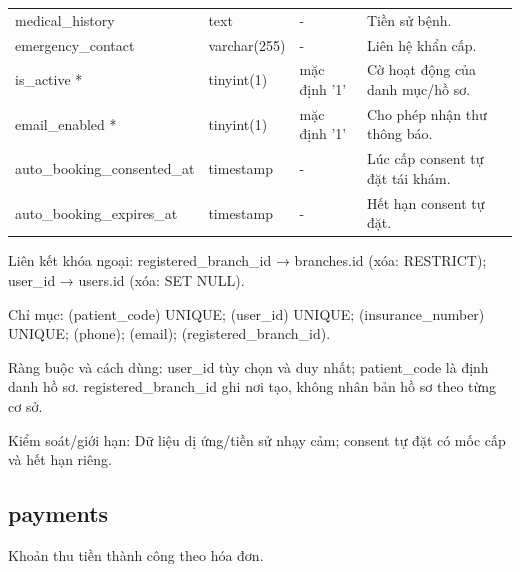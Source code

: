 {\begin{longtable}{@{}L{\textwidth-4.86pt\relax} L{\textwidth-3.96pt\relax} L{\textwidth-2.88pt\relax} L{\textwidth-6.3pt\relax}@{}}
medical\_\allowbreak{}history & text & - & Tiền sử bệnh.\allowbreak{}\\[1pt]
emergency\_\allowbreak{}contact & varchar(255) & - & Liên hệ khẩn cấp.\allowbreak{}\\[1pt]
is\_\allowbreak{}active * & tinyint(1) & mặc định '1' & Cờ hoạt động của danh mục/\allowbreak{}hồ sơ.\allowbreak{}\\[1pt]
email\_\allowbreak{}enabled * & tinyint(1) & mặc định '1' & Cho phép nhận thư thông báo.\allowbreak{}\\[1pt]
auto\_\allowbreak{}booking\_\allowbreak{}consented\_\allowbreak{}at & timestamp & - & Lúc cấp consent tự đặt tái khám.\allowbreak{}\\[1pt]
auto\_\allowbreak{}booking\_\allowbreak{}expires\_\allowbreak{}at & timestamp & - & Hết hạn consent tự đặt.\allowbreak{}\\[1pt]
\end{longtable}}
Liên kết khóa ngoại:\allowbreak{} registered\_\allowbreak{}branch\_\allowbreak{}id → branches.\allowbreak{}id (xóa:\allowbreak{} RESTRICT); user\_\allowbreak{}id → users.\allowbreak{}id (xóa:\allowbreak{} SET NULL).\allowbreak{}

Chỉ mục:\allowbreak{} (patient\_\allowbreak{}code) UNIQUE; (user\_\allowbreak{}id) UNIQUE; (insurance\_\allowbreak{}number) UNIQUE; (phone); (email); (registered\_\allowbreak{}branch\_\allowbreak{}id).\allowbreak{}

Ràng buộc và cách dùng:\allowbreak{} user\_\allowbreak{}id tùy chọn và duy nhất; patient\_\allowbreak{}code là định danh hồ sơ.\allowbreak{} registered\_\allowbreak{}branch\_\allowbreak{}id ghi nơi tạo, không nhân bản hồ sơ theo từng cơ sở.\allowbreak{}

Kiểm soát/\allowbreak{}giới hạn:\allowbreak{} Dữ liệu dị ứng/\allowbreak{}tiền sử nhạy cảm; consent tự đặt có mốc cấp và hết hạn riêng.\allowbreak{}

\clearpage

\subsection{payments}
Khoản thu tiền thành công theo hóa đơn.\allowbreak{}


